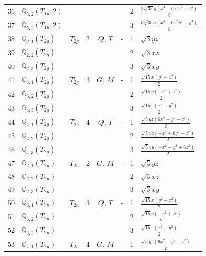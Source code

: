 \documentclass[fleqn,10pt,landscape]{jsarticle}
\begin{document}
\begin{longtable}[l]{clcccccl}
36 & $\mathbb{Q}_{5,2}(T_{1u},2)$ &  &  &  &  & 2 & $\frac{3 \sqrt{35} y \left(x^{4} - 6 x^{2} z^{2} + z^{4}\right)}{8}$ \\
37 & $\mathbb{Q}_{5,3}(T_{1u},2)$ &  &  &  &  & 3 & $\frac{3 \sqrt{35} z \left(x^{4} - 6 x^{2} y^{2} + y^{4}\right)}{8}$ \\ \hline
38 & $\mathbb{Q}_{2,1}(T_{2g})$ & $T_{2g}$ & 2 & $Q$, $T$ & - & 1 & $\sqrt{3} y z$ \\
39 & $\mathbb{Q}_{2,2}(T_{2g})$ &  &  &  &  & 2 & $\sqrt{3} x z$ \\
40 & $\mathbb{Q}_{2,3}(T_{2g})$ &  &  &  &  & 3 & $\sqrt{3} x y$ \\ \hline
41 & $\mathbb{G}_{3,1}(T_{2g})$ & $T_{2g}$ & 3 & $G$, $M$ & - & 1 & $\frac{\sqrt{15} x \left(y^{2} - z^{2}\right)}{2}$ \\
42 & $\mathbb{G}_{3,2}(T_{2g})$ &  &  &  &  & 2 & $\frac{\sqrt{15} y \left(- x^{2} + z^{2}\right)}{2}$ \\
43 & $\mathbb{G}_{3,3}(T_{2g})$ &  &  &  &  & 3 & $\frac{\sqrt{15} z \left(x^{2} - y^{2}\right)}{2}$ \\ \hline
44 & $\mathbb{Q}_{4,1}(T_{2g})$ & $T_{2g}$ & 4 & $Q$, $T$ & - & 1 & $\frac{\sqrt{5} y z \left(6 x^{2} - y^{2} - z^{2}\right)}{2}$ \\
45 & $\mathbb{Q}_{4,2}(T_{2g})$ &  &  &  &  & 2 & $\frac{\sqrt{5} x z \left(- x^{2} + 6 y^{2} - z^{2}\right)}{2}$ \\
46 & $\mathbb{Q}_{4,3}(T_{2g})$ &  &  &  &  & 3 & $\frac{\sqrt{5} x y \left(- x^{2} - y^{2} + 6 z^{2}\right)}{2}$ \\ \hline
47 & $\mathbb{G}_{2,1}(T_{2u})$ & $T_{2u}$ & 2 & $G$, $M$ & - & 1 & $\sqrt{3} y z$ \\
48 & $\mathbb{G}_{2,2}(T_{2u})$ &  &  &  &  & 2 & $\sqrt{3} x z$ \\
49 & $\mathbb{G}_{2,3}(T_{2u})$ &  &  &  &  & 3 & $\sqrt{3} x y$ \\ \hline
50 & $\mathbb{Q}_{3,1}(T_{2u})$ & $T_{2u}$ & 3 & $Q$, $T$ & - & 1 & $\frac{\sqrt{15} x \left(y^{2} - z^{2}\right)}{2}$ \\
51 & $\mathbb{Q}_{3,2}(T_{2u})$ &  &  &  &  & 2 & $\frac{\sqrt{15} y \left(- x^{2} + z^{2}\right)}{2}$ \\
52 & $\mathbb{Q}_{3,3}(T_{2u})$ &  &  &  &  & 3 & $\frac{\sqrt{15} z \left(x^{2} - y^{2}\right)}{2}$ \\ \hline
53 & $\mathbb{G}_{4,1}(T_{2u})$ & $T_{2u}$ & 4 & $G$, $M$ & - & 1 & $\frac{\sqrt{5} y z \left(6 x^{2} - y^{2} - z^{2}\right)}{2}$ \\

\end{longtable}
\end{document}
